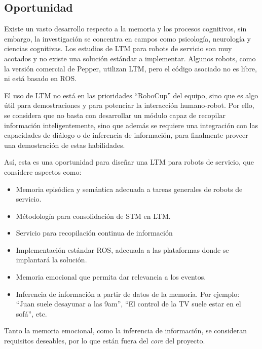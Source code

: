 \subsection{Oportunidad}

Existe un vasto desarrollo respecto a la memoria y los procesos cognitivos, sin embargo, la investigaci\'on se concentra en campos como psicolog\'ia, neurolog\'ia y ciencias cognitivas. 
Los estudios de LTM para robots de servicio son muy acotados y no existe una soluci\'on est\'andar a implementar. Algunos robots, como la versi\'on comercial de Pepper, utilizan LTM, pero el c\'odigo asociado no es libre, ni est\'a basado en ROS.

El uso de LTM no est\'a en las prioridades ``RoboCup'' del equipo, sino que es algo \'util para demostraciones y para potenciar la interacci\'on humano-robot. Por ello, se considera que no basta con desarrollar un m\'odulo capaz de recopilar informaci\'on inteligentemente, sino que adem\'as se requiere una integraci\'on con las capacidades de di\'alogo o de inferencia de informaci\'on, para finalmente proveer una demostraci\'on de estas habilidades.

As\'i, esta es una oportunidad para dise\~nar una LTM para robots de servicio, que considere aspectos como: 
\begin{itemize}
\item Memoria epis\'odica y sem\'antica adecuada a tareas generales de robots de servicio.
\item M\'etodolog\'ia para consolidaci\'on de STM en LTM.
\item Servicio para recopilaci\'on continua de informaci\'on
\item Implementaci\'on est\'andar ROS, adecuada a las plataformas donde se implantar\'a la soluci\'on.
\item Memoria emocional que permita dar relevancia a los eventos.
\item Inferencia de informaci\'on a partir de datos de la memoria. Por ejemplo: ``Juan suele desayunar a las 9am'', ``El control de la TV suele estar en el sof\'a'', etc.
\end{itemize}

Tanto la memoria emocional, como la inferencia de informaci\'on, se consideran requisitos deseables, por lo que est\'an fuera del \textit{core} del proyecto.

